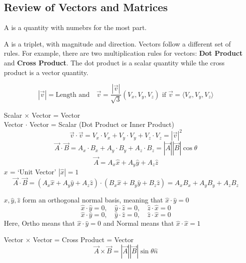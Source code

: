 \documentclass[11pt, draft]{article}
\begin{document}
\subsection{Review of Vectors and Matrices}
\begin{definition}
    A  is a quantity with numebrs for the most part.
\end{definition}

\begin{definition}
    A  is a triplet, with magnitude and direction. Vectors follow a different set of rules. For example, there are two multiplication rules for vectors: \textbf{Dot Product} and \textbf{Cross Product}. The dot product is a scalar quantity while the cross product is a vector quantity.

    \[
        |\vec{v}| = \text{Length and} \quad \vec{v} = \frac{|\vec{v}|}{\sqrt{3}}(V_x, V_y, V_z) \text{ if } \vec{v} = \langle V_x, V_y, V_z \rangle
    \]

    Scalar \(\times\) Vector = Vector \\ Vector \(\cdot\) Vector = Scalar (Dot
    Product or Inner Product) \\
    \[
        \vec{v} \cdot \vec{v} = V_x \cdot V_x + V_y \cdot V_y + V_z \cdot V_z = |\vec{v}|^2
    \]
    \[
        \vec{A} \cdot \vec{B} = A_x \cdot B_x + A_y \cdot B_y + A_z \cdot B_z = |\vec{A}| |\vec{B}| \cos \theta
    \]
    \[
        \vec{A} = A_x \hat{x} + A_y \hat{y} + A_z \hat{z} \]
    \(\hat{x}\) = `Unit Vector'
    \(|\hat{x}| = 1\)
    \[\vec{A} \cdot \vec{B} = (A_x \hat{x} + A_y \hat{y} + A_z \hat{z}) \cdot (B_x \hat{x} + B_y \hat{y} + B_z \hat{z}) = A_x B_x + A_y B_y + A_z B_z\]

    \(\hat{x}, \hat{y}, \hat{z}\) form an orthogonal normal basis, meaning that \(\hat{x} \cdot \hat{y} = 0\)
    \[\hat{x} \cdot \hat{y} = 0, \quad \hat{y} \cdot \hat{z} = 0, \quad \hat{z} \cdot \hat{x} = 0\]
    \[
        \hat{x} \cdot \hat{y} = 0, \quad \hat{y} \cdot \hat{z} = 0, \quad \hat{z} \cdot \hat{x} = 0
    \]
    Here, Ortho means that \(\hat{x} \cdot \hat{y} = 0\) and Normal means that
    \(\hat{x} \cdot \hat{x} = 1\)

\end{definition}

Vector \(\times\) Vector = Cross Product = Vector
\[
    \vec{A} \times \vec{B} = |\vec{A}| |\vec{B}| \sin \theta \hat{n}
\]
\end{document}
